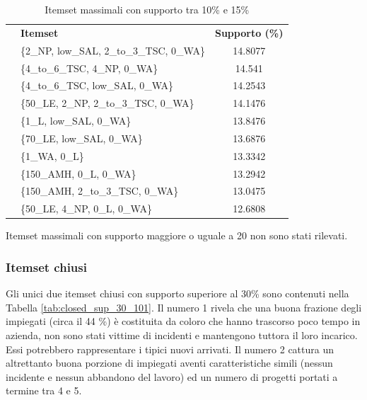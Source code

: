 \documentclass[a4paper]{article}
\newcounter{rowno}
\begin{document}
\begin{table}[h]
\centering
\begingroup
\setlength{\tabcolsep}{5pt} %
\renewcommand{\arraystretch}{1} %
\setcounter{rowno}{0}

\begin{tabularx}{\textwidth}{|>{\stepcounter{rowno}\therowno}c|X|c|}
\hline
\multicolumn{1}{r}{\#} & {\textbf{Itemset}} & {\textbf{Supporto (\%)}} \\
 
& \{2\_NP, low\_SAL, 2\_to\_3\_TSC, 0\_WA\} & 14.8077 \\ 
& \{4\_to\_6\_TSC, 4\_NP, 0\_WA\} & 14.541 \\ 
& \{4\_to\_6\_TSC, low\_SAL, 0\_WA\} & 14.2543 \\ 
& \{50\_LE, 2\_NP, 2\_to\_3\_TSC, 0\_WA\} & 14.1476 \\ 
& \{1\_L, low\_SAL, 0\_WA\} & 13.8476 \\ 
& \{70\_LE, low\_SAL, 0\_WA\} & 13.6876 \\ 
& \{1\_WA, 0\_L\} & 13.3342 \\ 
& \{150\_AMH, 0\_L, 0\_WA\} & 13.2942 \\ 
& \{150\_AMH, 2\_to\_3\_TSC, 0\_WA\} & 13.0475 \\ 
& \{50\_LE, 4\_NP, 0\_L, 0\_WA\} & 12.6808 \\ 
 
\hline
\end{tabularx}
\endgroup
\caption{Itemset massimali con supporto tra 10\% e 15\%}
\label{tab:maximal_10_15}
\end{table}

\noindent
Itemset massimali con supporto maggiore o uguale a 20 non sono stati rilevati.



\subsubsection{Itemset chiusi}

Gli unici due itemset chiusi con supporto superiore al 30\% sono contenuti nella Tabella \ref{tab:closed_sup_30_101}. Il numero 1 rivela che una buona frazione degli impiegati (circa il 44 \%) è costituita da coloro che hanno trascorso poco tempo in azienda, non sono stati vittime di incidenti e mantengono tuttora il loro incarico. Essi potrebbero rappresentare i tipici nuovi arrivati. Il numero 2 cattura un altrettanto buona porzione di impiegati aventi caratteristiche simili (nessun incidente e nessun abbandono del lavoro) ed un numero di progetti portati a termine tra 4 e 5.
\end{document}
